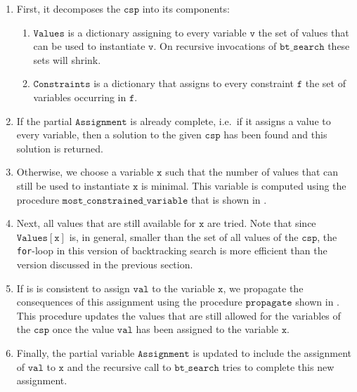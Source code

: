 \begin{enumerate}
\item First, it decomposes the $\mathtt{csp}$ into its components:
      \begin{enumerate}
      \item $\mathtt{Values}$ is a dictionary assigning to every variable $\mathtt{v}$ the set of values 
            that can be used to instantiate $\mathtt{v}$.  On recursive invocations of $\mathtt{bt\_search}$
            these sets will shrink.
      \item $\mathtt{Constraints}$ is a dictionary that assigns to every constraint $\mathtt{f}$ the set of
            variables occurring in $\mathtt{f}$.
      \end{enumerate}
\item If the partial $\mathtt{Assignment}$ is already complete, i.e.~if it assigns a value to every variable, 
      then a solution to the given $\mathtt{csp}$ has been found and this solution is returned.
\item Otherwise, we choose a variable $\mathtt{x}$ such that the number of values that can still be used to
      instantiate $\mathtt{x}$ is minimal.  This variable is computed using the procedure
      $\mathtt{most\_constrained\_variable}$ that is shown in .
\item Next, all values that are still available for $\mathtt{x}$ are tried.  Note that since
      $\mathtt{Values[x]}$ is, in general, smaller than the set of all values of the $\mathtt{csp}$,
      the \texttt{for}-loop in this version of backtracking search is more efficient than the version discussed
      in the previous section. 
\item If is is consistent to assign $\mathtt{val}$ to the variable $\mathtt{x}$, we propagate the consequences
      of this assignment using the procedure $\mathtt{propagate}$ shown in
      .
      This procedure updates the values that are still allowed for the variables of the $\mathtt{csp}$ once the
      value $\mathtt{val}$ has been assigned to the variable $\mathtt{x}$.
\item Finally, the partial variable $\mathtt{Assignment}$ is updated to include the assignment of 
      $\mathtt{val}$ to $\mathtt{x}$ and the recursive call to $\mathtt{bt\_search}$ tries to complete this new
      assignment. 
\end{enumerate}

